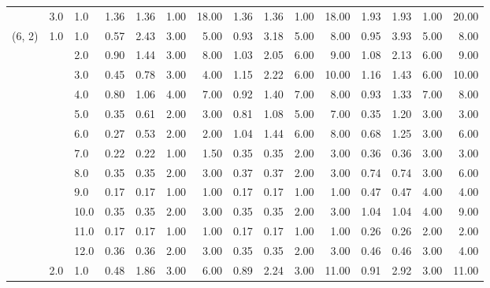 \begin{tabular}{lllrrrrrrrrrrrr}
       & 3.0 & 1.0  &       1.36 &      1.36 & 1.00 &  18.00 &       1.36 &      1.36 &  1.00 &  18.00 &       1.93 &      1.93 &  1.00 &  20.00 \\
(6, 2) & 1.0 & 1.0  &       0.57 &      2.43 & 3.00 &   5.00 &       0.93 &      3.18 &  5.00 &   8.00 &       0.95 &      3.93 &  5.00 &   8.00 \\
       &     & 2.0  &       0.90 &      1.44 & 3.00 &   8.00 &       1.03 &      2.05 &  6.00 &   9.00 &       1.08 &      2.13 &  6.00 &   9.00 \\
       &     & 3.0  &       0.45 &      0.78 & 3.00 &   4.00 &       1.15 &      2.22 &  6.00 &  10.00 &       1.16 &      1.43 &  6.00 &  10.00 \\
       &     & 4.0  &       0.80 &      1.06 & 4.00 &   7.00 &       0.92 &      1.40 &  7.00 &   8.00 &       0.93 &      1.33 &  7.00 &   8.00 \\
       &     & 5.0  &       0.35 &      0.61 & 2.00 &   3.00 &       0.81 &      1.08 &  5.00 &   7.00 &       0.35 &      1.20 &  3.00 &   3.00 \\
       &     & 6.0  &       0.27 &      0.53 & 2.00 &   2.00 &       1.04 &      1.44 &  6.00 &   8.00 &       0.68 &      1.25 &  3.00 &   6.00 \\
       &     & 7.0  &       0.22 &      0.22 & 1.00 &   1.50 &       0.35 &      0.35 &  2.00 &   3.00 &       0.36 &      0.36 &  3.00 &   3.00 \\
       &     & 8.0  &       0.35 &      0.35 & 2.00 &   3.00 &       0.37 &      0.37 &  2.00 &   3.00 &       0.74 &      0.74 &  3.00 &   6.00 \\
       &     & 9.0  &       0.17 &      0.17 & 1.00 &   1.00 &       0.17 &      0.17 &  1.00 &   1.00 &       0.47 &      0.47 &  4.00 &   4.00 \\
       &     & 10.0 &       0.35 &      0.35 & 2.00 &   3.00 &       0.35 &      0.35 &  2.00 &   3.00 &       1.04 &      1.04 &  4.00 &   9.00 \\
       &     & 11.0 &       0.17 &      0.17 & 1.00 &   1.00 &       0.17 &      0.17 &  1.00 &   1.00 &       0.26 &      0.26 &  2.00 &   2.00 \\
       &     & 12.0 &       0.36 &      0.36 & 2.00 &   3.00 &       0.35 &      0.35 &  2.00 &   3.00 &       0.46 &      0.46 &  3.00 &   4.00 \\
       & 2.0 & 1.0  &       0.48 &      1.86 & 3.00 &   6.00 &       0.89 &      2.24 &  3.00 &  11.00 &       0.91 &      2.92 &  3.00 &  11.00 \\

\end{tabular}
